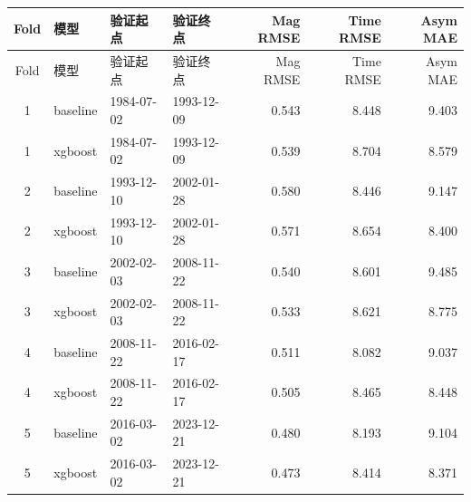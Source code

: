 \begingroup
\footnotesize
\setlength{\tabcolsep}{4pt}
\begin{longtable}{clllrrr}
\toprule
Fold & 模型 & 验证起点 & 验证终点 & Mag RMSE & Time RMSE & Asym MAE \\
\midrule
\endfirsthead
\toprule
Fold & 模型 & 验证起点 & 验证终点 & Mag RMSE & Time RMSE & Asym MAE \\
\midrule
\endhead
1 & baseline & 1984-07-02 & 1993-12-09 & 0.543 & 8.448 & 9.403 \\
1 & xgboost & 1984-07-02 & 1993-12-09 & 0.539 & 8.704 & 8.579 \\
2 & baseline & 1993-12-10 & 2002-01-28 & 0.580 & 8.446 & 9.147 \\
2 & xgboost & 1993-12-10 & 2002-01-28 & 0.571 & 8.654 & 8.400 \\
3 & baseline & 2002-02-03 & 2008-11-22 & 0.540 & 8.601 & 9.485 \\
3 & xgboost & 2002-02-03 & 2008-11-22 & 0.533 & 8.621 & 8.775 \\
4 & baseline & 2008-11-22 & 2016-02-17 & 0.511 & 8.082 & 9.037 \\
4 & xgboost & 2008-11-22 & 2016-02-17 & 0.505 & 8.465 & 8.448 \\
5 & baseline & 2016-03-02 & 2023-12-21 & 0.480 & 8.193 & 9.104 \\
5 & xgboost & 2016-03-02 & 2023-12-21 & 0.473 & 8.414 & 8.371 \\
\bottomrule
\end{longtable}
\endgroup
